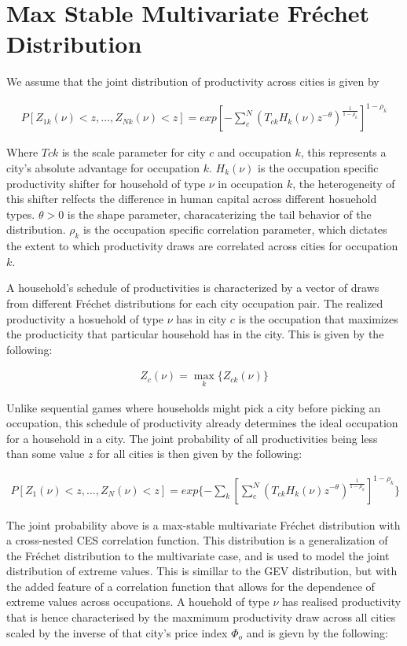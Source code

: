 \documentclass[10pt]{article}
\begin{document}
\section{Max Stable Multivariate Fréchet Distribution}

We assume that the joint distribution of productivity across cities is given by

\begin{align}
    P[Z_{1k}(\nu) < z, \dots, Z_{Nk} (\nu) < z] = exp[-\sum_{c}^{N}(T_{ck} H_k(\nu) z^{-\theta})^{\frac{1}{1 - \rho_k}}]^{1 - \rho_k}
\end{align}

Where $T{ck}$ is the scale parameter for city $c$ and occupation $k$, this represents a city's absolute advantage for occupation $k$. $H_k(\nu)$ is the occupation specific productivity shifter for household of type $\nu$ in occupation $k$, the heterogeneity of this shifter relfects the difference in human capital across different hosuehold types. $\theta > 0$ is the shape parameter, characaterizing the tail behavior of the distribution. $\rho_k$ is the occupation specific correlation parameter, which dictates the extent to which productivity draws are correlated across cities for occupation $k$.

A household's schedule of productivities is characterized by a vector of draws from different Fréchet distributions for each city occupation pair. The realized productivity a hosuehold of type $\nu$ has in city $c$ is the occupation that maximizes the producticity that particular household has in the city. This is given by the following:

\begin{align}
    Z_c(\nu) = \max_{k} \{Z_{ck}(\nu)\}
\end{align}

Unlike sequential games where households might pick a city before picking an occupation, this schedule of productivity already determines the ideal occupation for a household in a city. The joint probability of all productivities being less than some value $z$ for all cities is then given by the following:

\begin{align}
    P[Z_1(\nu) < z, \dots, Z_N(\nu) < z] = exp\{- \sum_{k}^{}[\sum_{c}^{N}(T_{ck} H_k(\nu) z^{-\theta})^{\frac{1}{1 - \rho_k}}]^{1 - \rho_k}\}
\end{align}

The joint probability above is a max-stable multivariate Fréchet distribution with a cross-nested CES correlation function. This distribution is a generalization of the Fréchet distribution to the multivariate case, and is used to model the joint distribution of extreme values. This is simillar to the GEV distribution, but with the added feature of a correlation function that allows for the dependence of extreme values across occupations. A houehold of type $\nu$ has realised productivity that is hence characterised by the maxmimum productivity draw across all cities scaled by the inverse of that city's price index $\Phi_o$ and is gievn by the following:
\end{document}
